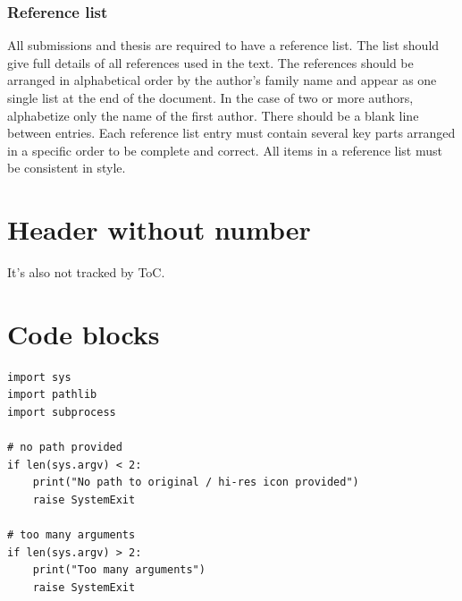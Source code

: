 \subsubsection{Reference list}

All submissions and thesis are required to have a reference list. The list should give full details of all references used in the text. The references should be arranged in alphabetical order by the author’s family name and appear as one single list at the end of the document. In the case of two or more authors, alphabetize only the name of the first author. There should be a blank line between entries. Each reference list entry must contain several key parts arranged in a specific order to be complete and correct. All items in a reference list must be consistent in style.

\section*{Header without number}

It's also not tracked by ToC.

\newpage

\section{Code blocks}

\begin{lstlisting}[style=py]
import sys
import pathlib
import subprocess

# no path provided
if len(sys.argv) < 2:
    print("No path to original / hi-res icon provided")
    raise SystemExit

# too many arguments
if len(sys.argv) > 2:
    print("Too many arguments")
    raise SystemExit
\end{lstlisting}
